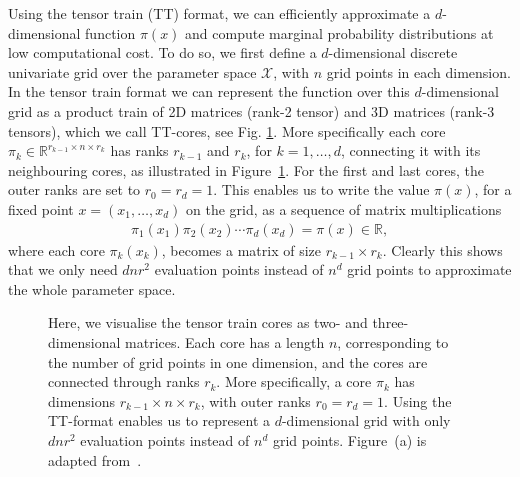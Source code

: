 Using the tensor train (TT) format, we can efficiently approximate a $d$-dimensional function $\pi(x)$ and compute marginal probability distributions at low computational cost. To do so, we first define a $d$-dimensional discrete univariate grid over the parameter space $\mathcal{X}$, with $n$ grid points in each dimension.
In the tensor train format we can represent the function over this $d$-dimensional grid as a product train of 2D matrices (rank-2 tensor) and 3D matrices (rank-3 tensors), which we call TT-cores, see Fig. \ref{fig:TTfig}. More specifically each core $\pi_k \in \mathbb{R}^{r_{k-1} \times n \times r_k}$ has ranks $r_{k-1}$ and $r_k$, for $k = 1, \dots, d$, connecting it with its neighbouring cores, as illustrated in Figure~\ref{fig:TTfig}.
For the first and last cores, the outer ranks are set to $r_0 = r_d = 1$.
This enables us to write the value $\pi(x)$, for a fixed point $x = (x_1, \dots, x_d)$ on the grid, as a sequence of matrix multiplications 
\begin{align*}
\pi_1(x_1)  \pi_2(x_2)  \cdots \pi_d(x_d) = 	\pi(x)  \in \mathbb{R},
\end{align*}
where each core $\pi_k(x_k)$, becomes a matrix of size $r_{k-1} \times r_k$.
Clearly this shows that we only need $dnr^2$ evaluation points instead of $n^d$ grid points to approximate the whole parameter space.
\begin{figure}[ht!]
	\centering
\begin{subfigure}{\textwidth}
	
	\caption{}
\end{subfigure}
	\centering
\begin{subfigure}{\textwidth}
	\caption{}
\end{subfigure}
\caption[Visualisation of a tensor train]{Here, we visualise the tensor train cores as two- and three-dimensional matrices. 
Each core has a length $n$, corresponding to the number of grid points in one dimension, and the cores are connected through ranks $r_k$. 
More specifically, a core $\pi_k$ has dimensions $r_{k-1} \times n \times r_k$, with outer ranks $r_0 = r_d = 1$.
Using the TT-format enables us to represent a $d$-dimensional grid with only $dnr^2$ evaluation points instead of $n^d$ grid points.
Figure~(a) is adapted from~\cite{fox2021grid}.}
\label{fig:TTfig}
\end{figure}

